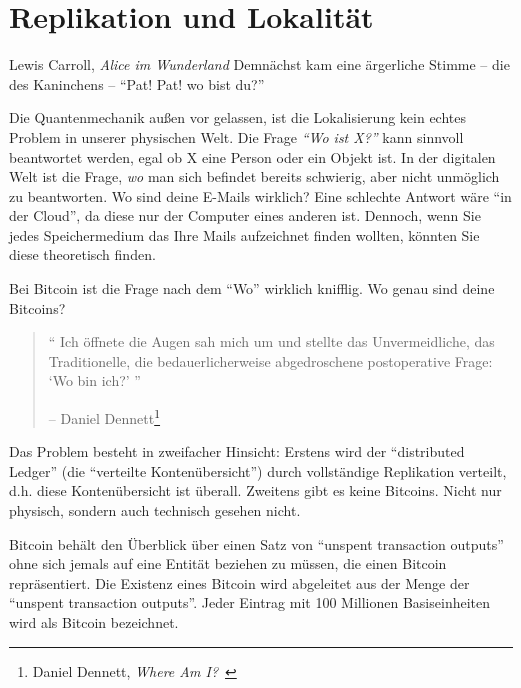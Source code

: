 \chapter{Replikation und Lokalität}
\label{les:3}

\begin{chapquote}{Lewis Carroll, \textit{Alice im Wunderland}}
Demnächst kam eine ärgerliche Stimme -- die des Kaninchens -- \enquote{Pat! Pat! wo bist du?}
\end{chapquote}

Die Quantenmechanik außen vor gelassen, ist die Lokalisierung kein echtes
Problem in unserer physischen Welt. Die Frage \textit{\enquote{Wo ist X?}} kann
sinnvoll beantwortet werden, egal ob X eine Person oder ein Objekt ist. In der
digitalen Welt ist die Frage, \textit{wo} man sich befindet bereits schwierig,
aber nicht unmöglich zu beantworten. Wo sind deine E-Mails wirklich? Eine
schlechte Antwort wäre \enquote{in der Cloud}, da diese nur der Computer eines
anderen ist. Dennoch, wenn Sie jedes Speichermedium das Ihre Mails aufzeichnet
finden wollten, könnten Sie diese theoretisch finden.

Bei Bitcoin ist die Frage nach dem \enquote{Wo} wirklich knifflig. Wo genau sind
deine Bitcoins?

\begin{quotation}\begin{samepage}
\enquote{
Ich öffnete die Augen sah mich um und stellte das Unvermeidliche, das
Traditionelle, die bedauerlicherweise abgedroschene postoperative Frage:
\enquote{Wo bin ich?}
}
\begin{flushright} -- Daniel Dennett\footnote{Daniel Dennett, \textit{Where Am I?}~\cite{where-am-i}}
\end{flushright}\end{samepage}\end{quotation}

Das Problem besteht in zweifacher Hinsicht: Erstens wird der
\enquote{distributed Ledger} (die \enquote{verteilte Kontenübersicht}) durch
vollständige Replikation verteilt, d.h. diese Kontenübersicht ist überall.
Zweitens gibt es keine Bitcoins. Nicht nur physisch, sondern auch technisch
gesehen nicht.

Bitcoin behält den Überblick über einen Satz von \enquote{unspent transaction
outputs} ohne sich jemals auf eine Entität beziehen zu müssen, die einen Bitcoin
repräsentiert. Die Existenz eines Bitcoin wird abgeleitet aus der Menge der
\enquote{unspent transaction outputs}. Jeder Eintrag mit 100 Millionen
Basiseinheiten wird als Bitcoin bezeichnet.

